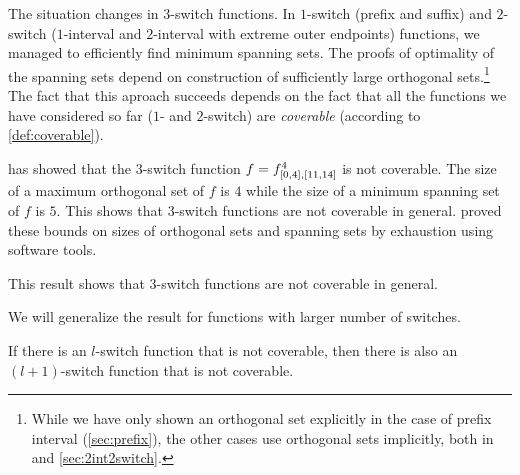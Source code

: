 The situation changes in $3$-switch functions.
In $1$-switch (prefix and suffix)
and $2$-switch ($1$-interval and $2$-interval
with extreme outer endpoints)
functions,
we managed to efficiently find minimum spanning sets.
The proofs of optimality of the spanning sets
depend on construction of sufficiently large
orthogonal sets.\footnote{While we have only shown
an orthogonal set explicitly
in the case of prefix interval (\autoref{sec:prefix}),
the other cases use orthogonal sets implicitly,
both in \citep{Schieber2005154}
and \autoref{sec:2int2switch}.}
The fact that this aproach succeeds
depends on the fact that all the functions we have considered so far ($1$- and $2$-switch)
are \emph{coverable}
(according to \cref{def:coverable}).

\citeauthor{Dubovsky2012} has showed that
the $3$-switch function
$f = f^{4}_{[0, 4], [11, 14]}$ is not coverable.
The size of a maximum orthogonal set of $f$ is $4$
while the size of a minimum spanning set of $f$ is $5$.
\citep[p.~32]{Dubovsky2012}
This shows that $3$-switch functions are not coverable in general.
\citeauthor{Dubovsky2012} proved these bounds
on sizes of orthogonal sets and spanning sets
by exhaustion using software tools.

This result shows that $3$-switch functions
are not coverable in general.

We will generalize the result for functions
with larger number of switches.

\begin{lemma}
If there is an $l$-switch function that is not coverable,
then there is also an $(l+1)$-switch function
that is not coverable.
\end{lemma}

